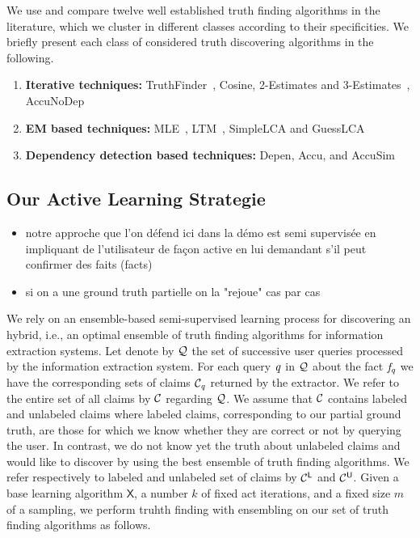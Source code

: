 

We use and compare twelve well established truth finding algorithms in the literature,
which we cluster in different classes according to their specificities.
We briefly present each class of considered truth discovering algorithms in the following.

\begin{enumerate}
 \item \textbf{Iterative techniques:} TruthFinder~\cite{YinHY08}, Cosine, 2-Estimates and 3-Estimates~\cite{GallandAMS10}, 
 AccuNoDep~\cite{DongBS09}
 \item \textbf{EM based techniques:} MLE~\cite{WangKLA12}, LTM~\cite{ZhaoRGH12}, SimpleLCA and GuessLCA~\cite{PasternackR13}
 \item \textbf{Dependency detection based techniques:} Depen, Accu, and AccuSim~\cite{DongBS09}
\end{enumerate}



\subsection{Our Active Learning Strategie}
\begin{itemize}
 \item notre approche que l'on défend ici dans la démo est  semi supervisée en impliquant de l'utilisateur de façon active
en lui demandant s'il peut confirmer des faits (facts)
\item si on a une ground truth partielle on la "rejoue" cas par cas
\end{itemize}

\medskip

We rely on an ensemble-based semi-supervised learning process for discovering an hybrid, i.e., an optimal ensemble of truth
finding algorithms for information extraction systems. Let denote by $\mathcal{Q}$ the set of successive user queries processed 
by the information extraction system. For each query $\mathit{q}$ in $\mathcal{Q}$ about the fact $\mathit{f}_{\mathit{q}}$ we have the corresponding
sets of claims $\mathcal{C}_{\mathit{q}}$ returned by the extractor. We refer to the entire set of all claims by $\mathcal{C}$ regarding $\mathcal{Q}$.
We assume that $\mathcal{C}$ contains labeled and unlabeled claims where labeled claims, corresponding to our partial ground truth, are those 
for which we  know whether they are correct or not by querying the user. In contrast, we do not know yet the truth about unlabeled claims and
would like to discover by using the best ensemble of truth finding algorithms. We refer respectively to labeled and unlabeled set of claims by 
$\mathcal{C}^{\mathsf{L}}$ and $\mathcal{C}^{\mathsf{U}}$. Given a base learning algorithm $\mathsf{X}$, a number $k$ of fixed act iterations, and 
a fixed size $m$ of a sampling, we perform truhth finding with ensembling on our set of truth finding algorithms as follows.

